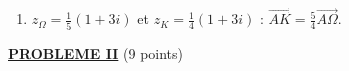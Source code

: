\begin{description}
\begin{enumerate}
\begin{enumerate}
				$z_{C'} = \frac{i}{2}(1 + i) + \frac{1+i}{2} = \frac{-1 + i + 1 + i}{2} = i$ ; $z_K = \frac{i}{2}\cdot\frac{1+i}{2} + \frac{1+i}{2} = \frac{-1 + i + 2 + 2i}{4}$.
				\par\noindent{}
			\item {}
				$z_\Omega = \frac{1}{5}(1 + 3i)$ et $z_K = \frac{1}{4}(1 + 3i)$ : $\overrightarrow{AK} = \frac{5}{4}\overrightarrow{A\Omega}$.
				\par\noindent{}
		\end{enumerate}
	\end{enumerate}
\end{description}
\noindent \underline{\textsc{\textbf{PROBLEME II}}} (9 points)
